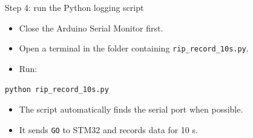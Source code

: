 \documentclass[aspectratio=169]{beamer}
\begin{document}
\begin{frame}{Step 4: run the Python logging script}

\begin{itemize}
    \item Close the Arduino Serial Monitor first.
    \vspace{0.3cm}

    \item Open a terminal in the folder containing \texttt{rip\_record\_10s.py}.
    \vspace{0.3cm}

    \item Run:
\end{itemize}

\vspace{0.1cm}

\begin{center}
\texttt{python rip\_record\_10s.py}
\end{center}

\vspace{0.25cm}

\begin{itemize}
    \item The script automatically finds the serial port when possible.
    \vspace{0.25cm}

    \item It sends \texttt{GO} to STM32 and records data for 10 s.
\end{itemize}

\end{frame}
\end{document}
